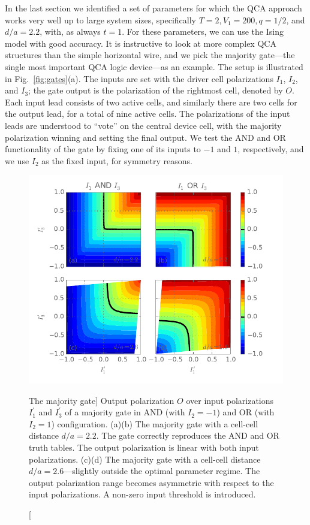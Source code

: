 In the last section we identified a set of parameters for which the QCA approach
works very well up to large system sizes, specifically $T = 2, V_1 = 200, q =
1/2$, and $d/a = 2.2$, with, as always $t = 1$. For these parameters, we can use
the Ising model with good accuracy. It is instructive to look at more complex
QCA structures than the simple horizontal wire, and we pick the majority
gate---the single most important QCA logic device---as an example. The setup is
illustrated in Fig.~\ref{fig:gates}(a). The inputs are set with the driver cell
polarizations $I_1$, $I_2$, and $I_3$; the gate output is the polarization of
the rightmost cell, denoted by $O$. Each input lead consists of two active
cells, and similarly there are two cells for the output lead, for a total of
nine active cells. The polarizations of the input leads are understood to
``vote'' on the central device cell, with the majority polarization winning and
setting the final output.  We test the AND and OR functionality of the gate by
fixing one of its inputs to $-1$ and $1$, respectively, and we use $I_2$ as the
fixed input, for symmetry reasons.

\begin{figure}
  \center
  \includegraphics{majority_gate_contour}
  \caption
  [The majority gate]
  {
  Output polarization $O$ over input polarizations $I_1^{\prime}$ and
  $I_3^{\prime}$ of a majority gate in AND (with $I_2 = -1$) and OR (with $I_2 =
  1$) configuration. (a)(b) The majority gate with a cell-cell distance $d/a =
  2.2$. The gate correctly reproduces the AND and OR truth tables. The output
  polarization is linear with both input polarizations. (c)(d) The majority gate with
  a cell-cell distance $d/a = 2.6$---slightly outside the optimal parameter
  regime. The output polarization range becomes asymmetric with respect to the
  input polarizations. A non-zero input threshold is introduced.
  }
  \label{fig:majority_gate_contour}
\end{figure}

